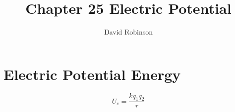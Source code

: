 \documentclass{article}
\title{Chapter 25 Electric Potential}
\author{David Robinson}
\date{}
\begin{document}
\maketitle

\section*{Electric Potential Energy}
\[U_e = \frac{kq_1q_2}{r}\]
\end{document}

